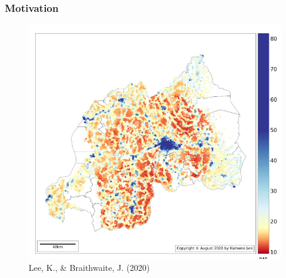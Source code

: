 \documentclass[
  shownotes,
  xcolor={svgnames},
  hyperref={colorlinks,citecolor=DarkBlue,linkcolor=DarkRed,urlcolor=DarkBlue}
  ]{beamer}
\begin{document}
\begin{frame}[fragile]
\frametitle{Motivation}

\begin{figure}[H] \centering
  \centering
  \includegraphics[scale=0.5]{figures/lee_rwanda}
  \\
  \tiny Lee, K., \& Braithwaite, J. (2020)
\end{figure}


\end{frame}

\end{document}
